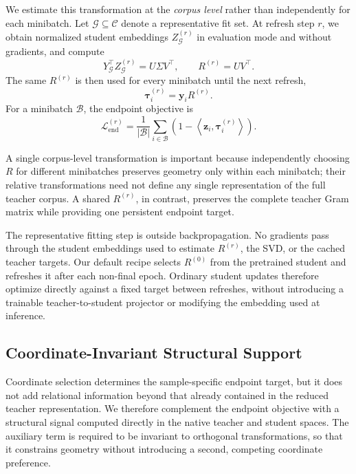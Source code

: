 We estimate this transformation at the \emph{corpus level} rather than
independently for each minibatch. Let
$\mathcal{G}\subseteq\mathcal{C}$ denote a representative fit set. At refresh
step $r$, we obtain normalized student embeddings $Z_{\mathcal{G}}^{(r)}$ in
evaluation mode and without gradients, and compute
\begin{equation}
    Y_{\mathcal{G}}^\top Z_{\mathcal{G}}^{(r)}
    =U\Sigma V^\top,
    \qquad
    R^{(r)}=UV^\top.
    \label{eq:coordinate-refresh}
\end{equation}
The same $R^{(r)}$ is then used for every minibatch until the next refresh,
\begin{equation}
    \boldsymbol{\tau}_i^{(r)}=\mathbf{y}_iR^{(r)}.
    \label{eq:refreshed-target}
\end{equation}
For a minibatch $\mathcal{B}$, the endpoint objective is
\begin{equation}
    \mathcal{L}_{\mathrm{end}}^{(r)}
    =\frac{1}{\lvert\mathcal{B}\rvert}
      \sum_{i\in\mathcal{B}}
      \left(1-\left\langle
      \mathbf{z}_i,\boldsymbol{\tau}_i^{(r)}
      \right\rangle\right).
    \label{eq:endpoint-loss}
\end{equation}

A single corpus-level transformation is important because independently
choosing $R$ for different minibatches preserves geometry only within each
minibatch; their relative transformations need not define any single
representation of the full teacher corpus. A shared $R^{(r)}$, in contrast,
preserves the complete teacher Gram matrix while providing one persistent
endpoint target.

The representative fitting step is outside backpropagation. No gradients pass
through the student embeddings used to estimate $R^{(r)}$, the SVD, or the
cached teacher targets. Our default recipe selects $R^{(0)}$ from the pretrained
student and refreshes it after each non-final epoch. Ordinary student updates
therefore optimize directly against a fixed target between refreshes, without
introducing a trainable teacher-to-student projector or modifying the embedding
used at inference.

\subsection{Coordinate-Invariant Structural Support}
\label{sec:structural-support}

Coordinate selection determines the sample-specific endpoint target, but it
does not add relational information beyond that already contained in the
reduced teacher representation. We therefore complement the endpoint objective
with a structural signal computed directly in the native teacher and student
spaces. The auxiliary term is required to be invariant to orthogonal
transformations, so that it constrains geometry without introducing a second,
competing coordinate preference.


